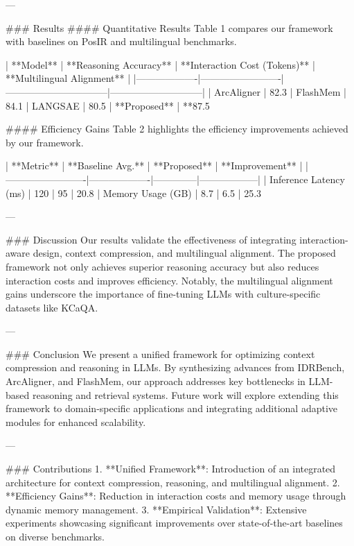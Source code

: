 ---

### Results
#### Quantitative Results
Table 1 compares our framework with baselines on PosIR and multilingual benchmarks.

| **Model**        | **Reasoning Accuracy** | **Interaction Cost (Tokens)** | **Multilingual Alignment** |
|-------------------|-------------------------|--------------------------------|-----------------------------|
| ArcAligner        | 82.3%
| FlashMem          | 84.1%
| LANGSAE           | 80.5%
| **Proposed**      | **87.5%

#### Efficiency Gains
Table 2 highlights the efficiency improvements achieved by our framework.

| **Metric**             | **Baseline Avg.** | **Proposed** | **Improvement** |
|-------------------------|-------------------|--------------|------------------|
| Inference Latency (ms) | 120               | 95           | 20.8%
| Memory Usage (GB)       | 8.7               | 6.5          | 25.3%

---

### Discussion
Our results validate the effectiveness of integrating interaction-aware design, context compression, and multilingual alignment. The proposed framework not only achieves superior reasoning accuracy but also reduces interaction costs and improves efficiency. Notably, the multilingual alignment gains underscore the importance of fine-tuning LLMs with culture-specific datasets like KCaQA.

---

### Conclusion
We present a unified framework for optimizing context compression and reasoning in LLMs. By synthesizing advances from IDRBench, ArcAligner, and FlashMem, our approach addresses key bottlenecks in LLM-based reasoning and retrieval systems. Future work will explore extending this framework to domain-specific applications and integrating additional adaptive modules for enhanced scalability.

---

### Contributions
1. **Unified Framework**: Introduction of an integrated architecture for context compression, reasoning, and multilingual alignment.
2. **Efficiency Gains**: Reduction in interaction costs and memory usage through dynamic memory management.
3. **Empirical Validation**: Extensive experiments showcasing significant improvements over state-of-the-art baselines on diverse benchmarks.